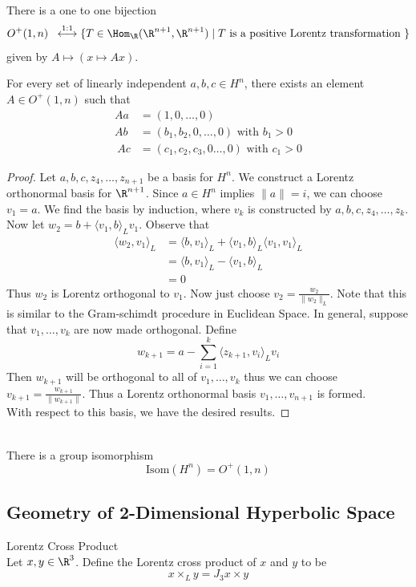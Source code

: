 \documentclass[a4paper]{article}
\begin{document}
\begin{prp}{}{}\\
There is a one to one bijection $$O^+(1,n)\;\;\overset{1:1}{\longleftrightarrow}\{T\in\Hom_\R(\R^{n+1},\R^{n+1})\;|\;T\text{ is a positive Lorentz transformation }\}$$ given by $A\mapsto(x\mapsto Ax)$. 
\end{prp}

\begin{lmm}{}{} For every set of linearly independent $a,b,c\in H^n$, there exists an element $A\in O^+(1,n)$ such that 
\begin{align*}
Aa&=(1,0,\dots,0)\\
Ab&=(b_1,b_2,0,\dots,0)\text{ with }b_1>0\\\
Ac&=(c_1,c_2,c_3,0\dots,0)\text{ with }c_1>0
\end{align*} 
\begin{proof}
Let $a,b,c,z_4,\dots,z_{n+1}$ be a basis for $H^n$. We construct a Lorentz orthonormal basis for $\R^{n+1}$. Since $a\in H^n$ implies $\|a\|=i$, we can choose $v_1=a$. We find the basis by induction, where $v_k$ is constructed by $a,b,c,z_4,\dots,z_k$. Now let $w_2=b+\langle v_1,b\rangle_L v_1$. Observe that 
\begin{align*}
\langle w_2,v_1\rangle_L&=\langle b,v_1\rangle_L+\langle v_1,b\rangle_L\langle v_1,v_1\rangle_L\\
&=\langle b,v_1\rangle_L-\langle v_1,b\rangle_L\tag{$\langle v_1,v_1\rangle_L=-1$}\\
&=0
\end{align*}
Thus $w_2$ is Lorentz orthogonal to $v_1$. Now just choose $v_2=\frac{w_2}{\|w_2\|_L}$. Note that this is similar to the Gram-schimdt procedure in Euclidean Space. In general, suppose that $v_1,\dots,v_k$ are now made orthogonal. Define $$w_{k+1}=a-\sum_{i=1}^k\langle z_{k+1},v_i\rangle_Lv_i$$ Then $w_{k+1}$ will be orthogonal to all of $v_1,\dots,v_k$ thus we can choose $v_{k+1}=\frac{w_{k+1}}{\|w_{k+1}\|}$. Thus a Lorentz orthonormal basis $v_1,\dots,v_{n+1}$ is formed. \\
With respect to this basis, we have the desired results. 
\end{proof}
\end{lmm}

\begin{prp}{}{}\\
There is a group isomorphism $$\text{Isom}(H^n)=O^+(1,n)$$
\end{prp}

\subsection{Geometry of 2-Dimensional Hyperbolic Space}
\begin{defn}{Lorentz Cross Product}{}\\
Let $x,y\in\R^3$. Define the Lorentz cross product of $x$ and $y$ to be $$x\times_Ly=J_3x\times y$$
\end{defn}
\end{document}
